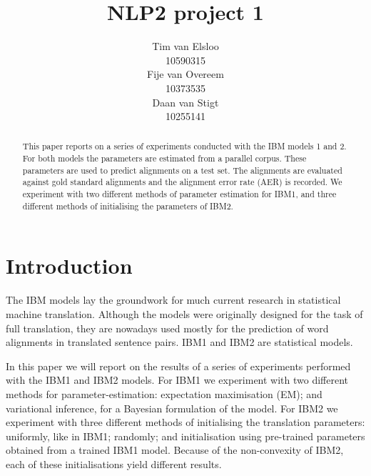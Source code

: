 \documentclass[11pt,a4paper]{article}
\title{NLP2 project 1}
\author{Tim van Elsloo \\
 10590315\\\And
  Fije van Overeem \\
  10373535 \\\And 
  Daan van Stigt \\
  10255141    }
\date{}
\begin{document}
\maketitle
\begin{abstract}
This paper reports on a series of experiments conducted with the IBM models 1 and 2. For both models the parameters are estimated from a parallel corpus. These parameters are used to predict alignments on a test set. The alignments are evaluated against gold standard alignments and the alignment error rate (AER) is recorded. We experiment with two different methods of parameter estimation for IBM1, and three different methods of initialising the parameters of IBM2.
\end{abstract}

\section{Introduction}

The IBM models \cite{brown1993} lay the groundwork for much current research in statistical machine translation. Although the models were originally designed for the task of full translation, they are nowadays used mostly for the prediction of word alignments in translated sentence pairs. IBM1 and IBM2 are statistical models. 

In this paper we will report on the results of a series of experiments performed with the IBM1 and IBM2 models. For IBM1 we experiment with two different methods for parameter-estimation: expectation maximisation (EM); and variational inference, for a Bayesian formulation of the model. For IBM2 we experiment with three different methods of initialising the translation parameters: uniformly, like in IBM1; randomly; and initialisation using pre-trained parameters obtained from a trained IBM1 model. Because of the non-convexity of IBM2, each of these initialisations yield different results.



\end{document}
